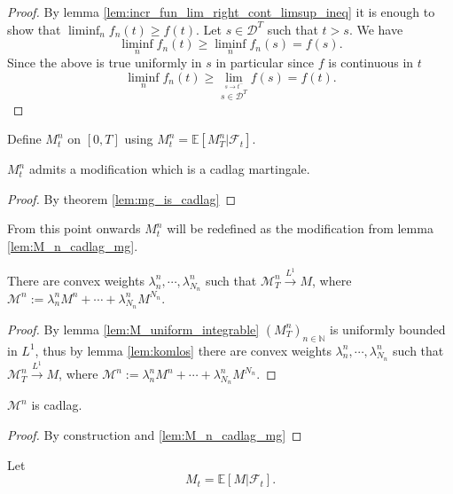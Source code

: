 \begin{proof}
  By lemma \ref{lem:incr_fun_lim_right_cont_limsup_ineq} it is enough to show that $\liminf_n f_n(t)\geq f(t)$.
  Let $s\in\mathcal{D}^T$ such that $t>s$. We have
  $$
  \liminf_n f_n(t)\geq \liminf_n f_n(s)=f(s).
  $$
  Since the above is true uniformly in $s$ in particular since $f$ is continuous in $t$
  $$
  \liminf_n f_n(t)\geq\lim_{\stackrel{s\rightarrow t^-}{s\in\mathcal{D}^T}}f(s)=f(t).
$$
\end{proof}

Define $M^n_t$ on $[0,T]$ using $M^n_t=\mathbb{E}[M^n_T\vert\mathcal{F}_t]$.

\begin{lemma}\label{lem:M_n_cadlag_mg}
  $M^n_t$ admits a modification which is a cadlag martingale.
\end{lemma}

\begin{proof}
  By theorem \ref{lem:mg_is_cadlag}
\end{proof}

From this point onwards $M^n_t$ will be redefined as the modification from lemma \ref{lem:M_n_cadlag_mg}.

\begin{lemma}\label{lem:M_cal_converges_L1}
  There are convex weights $\lambda^n_n,\cdots,\lambda^n_{N_n}$ such that
  $\mathcal{M}^n_T\stackrel{L^1}{\rightarrow}M$, where $\mathcal{M}^n:=\lambda^n_nM^n+\cdots +\lambda^n_{N_n}M^{N_n}.$
\end{lemma}
\begin{proof}
  By lemma \ref{lem:M_uniform_integrable} $(M^n_T)_{n\in\mathbb{N}}$ is uniformly bounded in $L^1$, thus by lemma \ref{lem:komlos} there are convex weights $\lambda^n_n,\cdots,\lambda^n_{N_n}$ such that
  $\mathcal{M}^n_T\stackrel{L^1}{\rightarrow}M$, where $\mathcal{M}^n:=\lambda^n_nM^n+\cdots +\lambda^n_{N_n}M^{N_n}.$
\end{proof}

\begin{lemma}\label{lem:M_cal_cadlag}
  $\mathcal{M}^n$ is cadlag.
\end{lemma}
\begin{proof}
  By construction and \ref{lem:M_n_cadlag_mg}
\end{proof}

Let \begin{equation}\label{equation_DM_e6} M_t = \mathbb{E}[M\vert\mathcal{F}_t].\end{equation}

